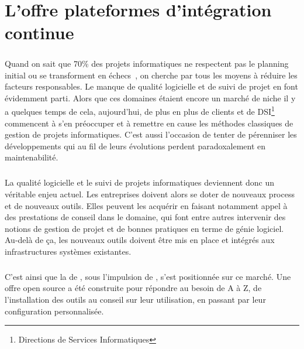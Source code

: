 \chapter{L'offre \og plateformes d'intégration continue \fg}
\label{section:pic}

\paragraph{}
Quand on sait que 70\% des projets informatiques ne respectent pas le planning initial ou se transforment en échecs~\cite{echec}, on cherche par tous les moyens à réduire les facteurs responsables.
Le manque de qualité logicielle et de suivi de projet en font évidemment parti.
Alors que ces domaines étaient encore un marché de niche il y a quelques temps de cela, aujourd'hui, de plus en plus de clients et de DSI\footnote{Directions de Services Informatiques} commencent à s'en préoccuper et à remettre en cause les méthodes classiques de gestion de projets informatiques.
C'est aussi l'occasion de tenter de pérenniser les développements qui au fil de leurs évolutions perdent paradoxalement en maintenabilité.

\paragraph{}
La qualité logicielle et le suivi de projets informatiques deviennent donc un véritable enjeu actuel.
Les entreprises doivent alors se doter de nouveaux process et de nouveaux outils. 
Elles peuvent les acquérir en faisant notamment appel à des prestations de conseil dans le domaine, qui font entre autres intervenir des notions de gestion de projet et de bonnes pratiques en terme de génie logiciel.
Au-delà de ça, les nouveaux outils doivent être mis en place et intégrés aux infrastructures systèmes existantes.

\paragraph{}
C'est ainsi que la \abusys{} de \asmile, sous l'impulsion de \agulet, s'est positionnée sur ce marché.
Une offre open source a été construite pour répondre au besoin de A à Z, de l'installation des outils au conseil sur leur utilisation, en passant par leur configuration personnalisée.















